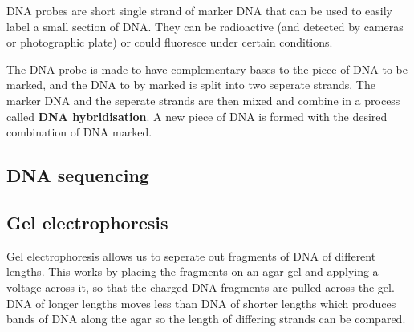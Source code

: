 \documentclass{article}
\begin{document}
DNA probes are short single strand of marker DNA that can be used to easily
label a small section of DNA. They can be radioactive (and detected by cameras
or photographic plate) or could fluoresce under certain conditions.

The DNA probe is made to have complementary bases to the piece of DNA to be
marked, and the DNA to by marked is split into two seperate strands. The marker
DNA and the seperate strands are then mixed and combine in a process called {\bf
DNA hybridisation}. A new piece of DNA is formed with the desired combination of
DNA marked.

\subsection*{DNA sequencing}


\subsection*{Gel electrophoresis}

Gel electrophoresis allows us to seperate out fragments of DNA of different
lengths. This works by placing the fragments on an agar gel and applying a
voltage across it, so that the charged DNA fragments are pulled across the gel.
DNA of longer lengths moves less than DNA of shorter lengths which produces
bands of DNA along the agar so the length of differing strands can be compared.



\end{document}
